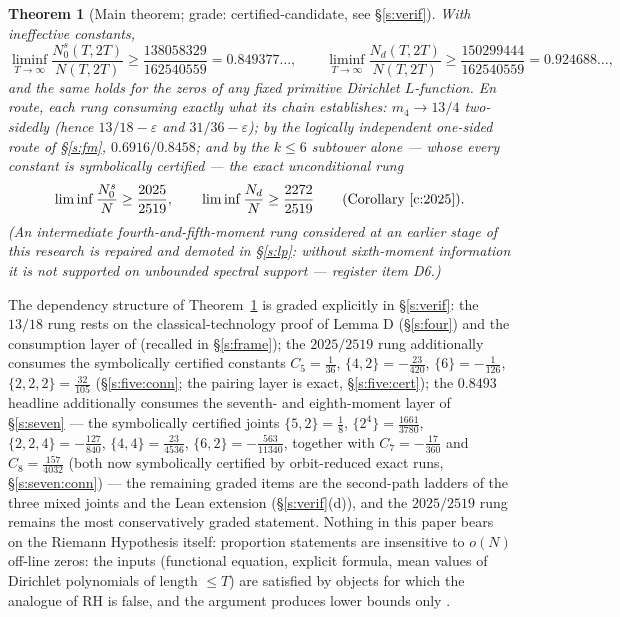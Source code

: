 \documentclass[11pt]{article}
\numberwithin{equation}{section}
\newtheorem{theorem}{Theorem}[section]
\theoremstyle{definition}
\theoremstyle{remark}
\begin{document}
\begin{theorem}[Main theorem; grade: certified-candidate, see
\S\ref{s:verif}]\label{t:main}
With ineffective constants,
\[
\liminf_{T\to\infty}\frac{N_0^{s}(T,2T)}{N(T,2T)}
\ge \frac{138058329}{162540559}=0.849377\ldots,
\qquad
\liminf_{T\to\infty}\frac{N_d(T,2T)}{N(T,2T)}
\ge \frac{150299444}{162540559}=0.924688\ldots,
\]
and the same holds for the zeros of any fixed primitive Dirichlet
$L$-function. En route, each rung consuming exactly what its
chain establishes: $m_4\to13/4$ two-sidedly (hence
$13/18-\varepsilon$ and $31/36-\varepsilon$); by the
logically independent one-sided route of \S\ref{s:fm},
$0.6916/0.8458$; and by the $k\le6$ subtower alone --- whose
every constant is symbolically certified --- the exact
unconditional rung
\[
\liminf\frac{N_0^{s}}{N}\ge\frac{2025}{2519},\qquad
\liminf\frac{N_d}{N}\ge\frac{2272}{2519}
\qquad(\text{Corollary~\ref{c:2025}}).
\]
(An intermediate fourth-and-fifth-moment rung considered at
an earlier stage of this research is repaired and demoted in
\S\ref{s:lp}: without sixth-moment information it is not
supported on unbounded spectral support --- register item D6.)
\end{theorem}

The dependency structure of Theorem~\ref{t:main} is graded
explicitly in \S\ref{s:verif}: the $13/18$ rung rests on the
classical-technology proof of Lemma D (\S\ref{s:four}) and
the consumption layer of \cite{C26} (recalled in
\S\ref{s:frame}); the $2025/2519$ rung
additionally consumes the symbolically certified constants
$C_5=\tfrac1{36}$, $\{4,2\}=-\tfrac{23}{420}$,
$\{6\}=-\tfrac1{126}$, $\{2,2,2\}=\tfrac{32}{105}$
(\S\ref{s:five:conn}; the pairing
layer is exact, \S\ref{s:five:cert}); the $0.8493$ headline
additionally consumes the seventh- and eighth-moment layer of
\S\ref{s:seven} --- the symbolically certified joints
$\{5,2\}=\tfrac18$, $\{2^4\}=\tfrac{1661}{3780}$,
$\{2,2,4\}=-\tfrac{127}{840}$, $\{4,4\}=\tfrac{23}{4536}$,
$\{6,2\}=-\tfrac{563}{11340}$, together with
$C_7=-\tfrac{17}{360}$ and $C_8=\tfrac{157}{4032}$ (both now
symbolically certified by orbit-reduced exact runs,
\S\ref{s:seven:conn}) --- the remaining graded items are the
second-path ladders of the three mixed joints and the Lean
extension (\S\ref{s:verif}(d)), and the
$2025/2519$ rung remains the most conservatively graded
statement. Nothing in this paper bears on the Riemann Hypothesis
itself: proportion statements are insensitive to $o(N)$ off-line
zeros: the inputs (functional equation, explicit formula, mean
values of Dirichlet polynomials of length $\le T$) are satisfied
by objects for which the analogue of RH is false, and the
argument produces lower bounds only \cite[\S1.5]{C26}.
\end{document}
